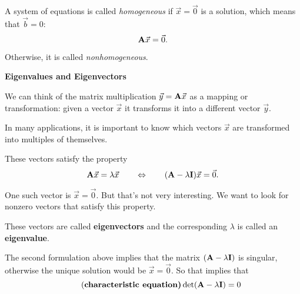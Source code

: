 \begin{definition}
	
A system of equations is called \emph{homogeneous} if $\vec{x}=\vec{0}$ is a solution, which means that $\vec{b} = 0$:
$$
{\bf A} \vec{x} = \vec{0}.
$$

Otherwise, it is called \emph{nonhomogeneous}.
\end{definition}



\hfil







\begin{center}\textbf{\color{cyan}Eigenvalues and Eigenvectors} 	
\end{center}


We can think of the matrix multiplication $\vec{y}={\bf A}\vec{x}$ as a mapping or transformation: given a vector $\vec{x}$ it transforms it into a different vector $\vec{y}$.

In many applications, it is important to know which vectors $\vec{x}$ are transformed into multiples of themselves.

These vectors satisfy the property
$$
{\bf A}\vec{x} = \lambda \vec{x} \qquad \Leftrightarrow \qquad ({\bf A} - \lambda {\bf I} ) \vec{x} = \vec{0}.
$$

One such vector is $\vec{x}=\vec{0}$. But that's not very interesting. We want to look for nonzero vectors that satisfy this property.

These vectors are called {\bf eigenvectors} and the corresponding $\lambda$ is called an {\bf eigenvalue}.

\begin{important}
The second formulation above implies that the matrix $({\bf A} - \lambda {\bf I})$ is singular, otherwise the unique solution would be $\vec{x}=\vec{0}$. 
So that implies that 
\begin{equation}\tag{\bf characteristic equation}
\det({\bf A} - \lambda {\bf I}) = 0
\end{equation}
\end{important}



